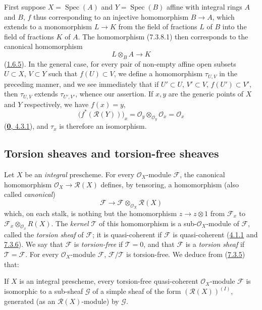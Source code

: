 First suppose $X=\operatorname{Spec}(A)$ and $Y=\operatorname{Spec}(B)$
affine with integral rings $A$ and $B$, $f$ thus corresponding to an injective
homomorphism $B\to A$, which extends to a monomorphism $L\to K$ from the field
of fractions $L$ of $B$ into the field of fractions $K$ of $A$. The
homomorphism (7.3.8.1) then corresponds to the canonical homomorphism
\[
  L\otimes_B A\to K
\]
(\hyperref[I.1.6.5]{1.6.5}). In the general case, for every pair of
non-empty affine open subsets $U\subset X$, $V\subset Y$ such that
$f(U)\subset V$, we define a homomorphism $\tau_{U,V}$ in the preceding
manner, and we see immediately that if $U'\subset U$, $V'\subset V$,
$f(U')\subset V'$, then $\tau_{U,V}$ extends $\tau_{U',V'}$, whence our
assertion. If $x,y$ are the generic points of $X$ and $Y$ respectively, we
have $f(x)=y$,
\[
  \bigl(f^*(\mathscr{R}(Y))\bigr)_x
  =\mathscr{O}_y\otimes_{\mathscr{O}_y}\mathscr{O}_x
  =\mathscr{O}_x
\]
(\hyperref[0.4.3.1]{\textbf{0}, 4.3.1}), and $\tau_x$ is therefore an isomorphism.

\subsection{Torsion sheaves and torsion-free sheaves}
\label{subsection:I.7.4}

\begin{env}[7.4.1]
\label{I.7.4.1}
Let $X$ be an \emph{integral} prescheme. For every $\mathscr{O}_X$-module
$\mathscr{F}$, the canonical homomorphism
$\mathscr{O}_X\to\mathscr{R}(X)$ defines, by tensoring, a homomorphism
(also called \emph{canonical})
\[
  \mathscr{F}\to
  \mathscr{F}\otimes_{\mathscr{O}_X}\mathscr{R}(X)
\]
which, on each stalk, is nothing but the homomorphism $z\to z\otimes 1$ from
$\mathscr{F}_x$ to
$\mathscr{F}_x\otimes_{\mathscr{O}_x}R(X)$. The \emph{kernel $\mathscr{T}$}
of this homomorphism is a sub-$\mathscr{O}_X$-module of $\mathscr{F}$,
called the \emph{torsion sheaf} of $\mathscr{F}$; it is quasi-coherent if
$\mathscr{F}$ is quasi-coherent
(\hyperref[I.4.1.1]{4.1.1} and \hyperref[I.7.3.6]{7.3.6}). We say that
$\mathscr{F}$ is \emph{torsion-free} if $\mathscr{T}=0$, and that
$\mathscr{F}$ is a \emph{torsion sheaf} if
$\mathscr{T}=\mathscr{F}$. For every $\mathscr{O}_X$-module $\mathscr{F}$,
$\mathscr{F}/\mathscr{T}$ is torsion-free. We deduce from
(\hyperref[I.7.3.5]{7.3.5}) that:
\end{env}

\begin{proposition}[7.4.2]
\label{I.7.4.2}
If $X$ is an integral prescheme, every torsion-free quasi-coherent
$\mathscr{O}_X$-module $\mathscr{F}$ is isomorphic to a sub-sheaf $\mathscr{G}$
of a simple sheaf of the form $(\mathscr{R}(X))^{(I)}$, generated (as an
$\mathscr{R}(X)$-module) by $\mathscr{G}$.
\end{proposition}

